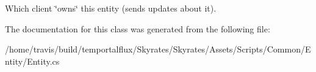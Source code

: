 Which client \char`\"{}owns\char`\"{} this entity (sends updates about it). 



The documentation for this class was generated from the following file\-:\begin{DoxyCompactItemize}
\item 
/home/travis/build/temportalflux/\-Skyrates/\-Skyrates/\-Assets/\-Scripts/\-Common/\-Entity/Entity.\-cs\end{DoxyCompactItemize}
